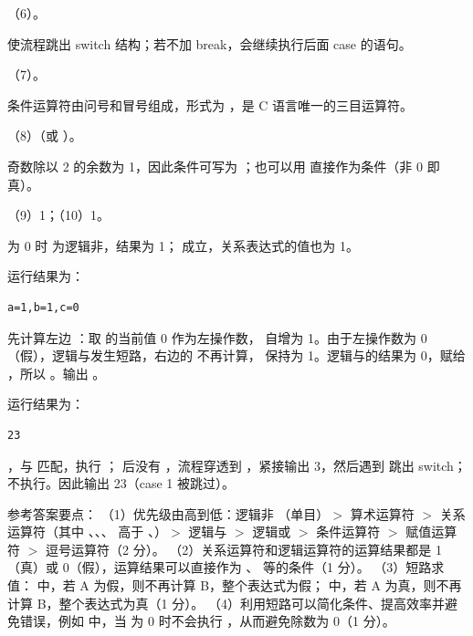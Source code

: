 \documentclass[a4paper,11pt]{article}
\begin{document}
\q （6）。\begin{analysis} 使流程跳出 switch 结构；若不加 break，会继续执行后面 case 的语句。\end{analysis}

\q （7）。\begin{analysis}条件运算符由问号和冒号组成，形式为 ，是 C 语言唯一的三目运算符。\end{analysis}

\q （8）（或 ）。\begin{analysis}奇数除以 2 的余数为 1，因此条件可写为 ；也可以用  直接作为条件（非 0 即真）。\end{analysis}

\q （9）1；（10）1。\begin{analysis} 为 0 时  为逻辑非，结果为 1； 成立，关系表达式的值也为 1。\end{analysis}


\q 运行结果为：
\begin{lstlisting}
a=1,b=1,c=0
\end{lstlisting}
\begin{analysis} 先计算左边 ：取  的当前值 0 作为左操作数， 自增为 1。由于左操作数为 0（假），逻辑与发生短路，右边的  不再计算， 保持为 1。逻辑与的结果为 0，赋给 ，所以 。输出 。\end{analysis}

\q 运行结果为：
\begin{lstlisting}
23
\end{lstlisting}
\begin{analysis}，与  匹配，执行 ； 后没有 ，流程穿透到 ，紧接输出 3，然后遇到  跳出 switch； 不执行。因此输出 23（case 1 被跳过）。\end{analysis}


\q 参考答案要点：
（1）优先级由高到低：逻辑非 \code{!}（单目）$>$ 算术运算符 $>$ 关系运算符（其中 \code{<}、\code{<=}、\code{>}、\code{>=} 高于 \code{==}、\code{!=}）$>$ 逻辑与 \code{\&\&} $>$ 逻辑或 \code{||} $>$ 条件运算符 $>$ 赋值运算符 $>$ 逗号运算符（2 分）。
（2）关系运算符和逻辑运算符的运算结果都是 1（真）或 0（假），运算结果可以直接作为 、 等的条件（1 分）。
（3）短路求值： 中，若 A 为假，则不再计算 B，整个表达式为假； 中，若 A 为真，则不再计算 B，整个表达式为真（1 分）。
（4）利用短路可以简化条件、提高效率并避免错误，例如  中，当  为 0 时不会执行 ，从而避免除数为 0（1 分）。
\end{document}
